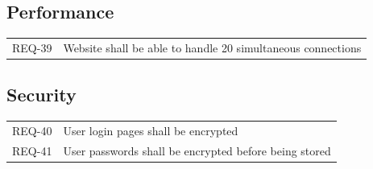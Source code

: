 \documentclass{article}
\newcommand{\req}[1]{REQ-{#1}}
\begin{document}
\subsection{Performance}

\begin{tabular}{lp{8cm}}
\req{39} & Website shall be able to handle 20 simultaneous connections\\
\end{tabular}

\subsection{Security}

\begin{tabular}{lp{8cm}}
\req{40} & User login pages shall be encrypted\\
\req{41} & User passwords shall be encrypted before being stored\\
\end{tabular}
\end{document}
